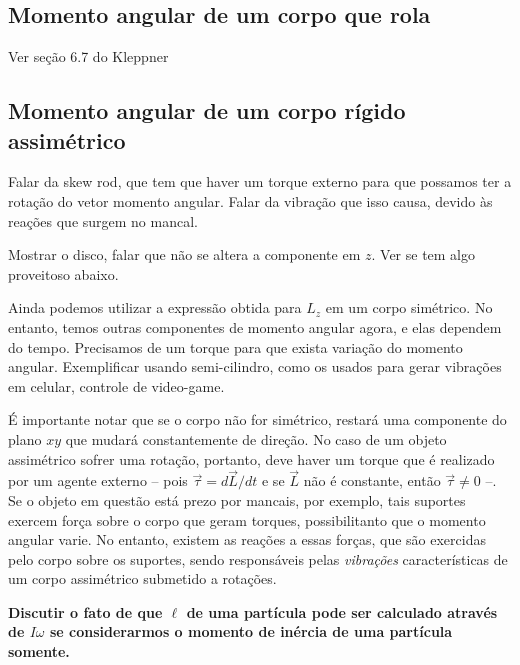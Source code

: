 \subsection{Momento angular de um corpo que rola}

Ver seção 6.7 do Kleppner

\subsection{Momento angular de um corpo rígido assimétrico}

Falar da skew rod, que tem que haver um torque externo para que possamos ter a rotação do vetor momento angular. Falar da vibração que isso causa, devido às reações que surgem no mancal.

Mostrar o disco, falar que não se altera a componente em $z$. Ver se tem algo proveitoso abaixo.


Ainda podemos utilizar a expressão obtida para $L_z$ em um corpo simétrico. No entanto, temos outras componentes de momento angular agora, e elas dependem do tempo. Precisamos de um torque para que exista variação do momento angular. Exemplificar usando semi-cilindro, como os usados para gerar vibrações em celular, controle de video-game.

É importante notar que se o corpo não for simétrico, restará uma componente do plano $xy$ que mudará constantemente de direção. No caso de um objeto assimétrico sofrer uma rotação, portanto, deve haver um torque que é realizado por um agente externo -- pois $\vec{\tau} = d\vec{L} / dt$ e se $\vec{L}$ não é constante, então $\vec{\tau} \neq 0$ --. Se o objeto em questão está prezo por mancais, por exemplo, tais suportes exercem força sobre o corpo que geram torques, possibilitanto que o momento angular varie. No entanto, existem as reações a essas forças, que são exercidas pelo corpo sobre os suportes, sendo responsáveis pelas \emph{vibrações} características de um corpo assimétrico submetido a rotações.

\textbf{Discutir o fato de que $\ell$ de uma partícula pode ser calculado através de $I\omega$ se considerarmos o momento de inércia de uma partícula somente.}

